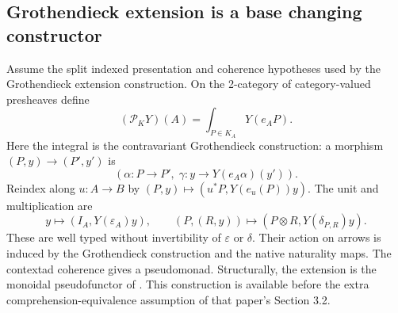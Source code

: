 \documentclass[11pt]{article}
\theoremstyle{definition}
\begin{document}
\subsection{Grothendieck extension is a base changing constructor}

Assume the split indexed presentation and coherence hypotheses used by the
Grothendieck extension construction. On the 2-category of category-valued
presheaves define
\begin{equation}\label{eq:groth}
 (\mathcal P_KY)(A)=\int_{P\in K_A}Y(e_AP).
\end{equation}
Here the integral is the contravariant Grothendieck construction: a morphism
$(P,y)\to(P',y')$ is
\[
 (\alpha:P\to P',\;\gamma:y\to Y(e_A\alpha)(y')).
\]
Reindex along $u:A\to B$ by
$(P,y)\mapsto(u^*P,Y(e_u(P))y)$. The unit and multiplication are
\begin{equation}\label{eq:grothmonad}
 y\longmapsto(I_A,Y(\varepsilon_A)y),\qquad
 (P,(R,y))\longmapsto(P\otimes R,Y(\delta_{P,R})y).
\end{equation}
These are well typed without invertibility of $\varepsilon$ or $\delta$.
Their action on arrows is induced by the Grothendieck construction and the
native naturality maps. The contextad coherence gives a pseudomonad.
Structurally, the extension is the monoidal pseudofunctor of
\cite[Construction 3.1 and Proposition 3.2]{Kamiya}. This construction is
available before the extra comprehension-equivalence assumption of that
paper's Section 3.2.
\end{document}
